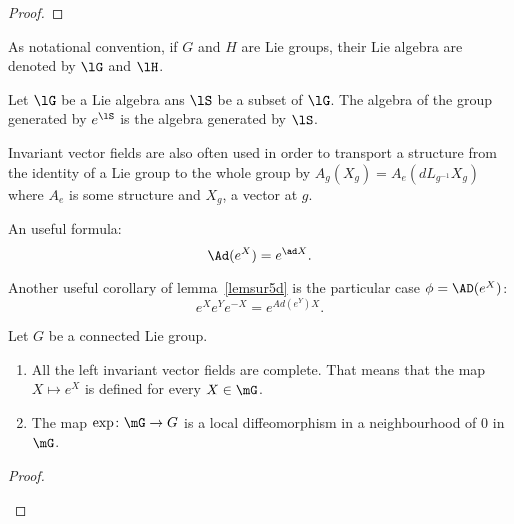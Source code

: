 \begin{theorem}
\begin{proof}
\end{proof}

As notational convention, if $G$ and $H$ are Lie groups, their Lie algebra are denoted by $\lG$ and $\lH$.

\begin{lemma}		\label{LemAlgEtGroupesGenere}
	Let $\lG$ be a Lie algebra ans $\lS$ be a subset of $\lG$. The algebra of the group generated by $ e^{\lS}$ is the algebra generated by $\lS$.
\end{lemma}

Invariant vector fields are also often used in order to transport a structure from the identity of a Lie group to the whole group by $A_g(X_g)=A_e(dL_{g^{-1}}X_g)$ where $A_e$ is some structure and $X_g$, a vector at $g$.


\begin{corollary}\label{Ad_e}
	An useful formula:
	\[
		\Ad(e^X)=e^{\ad X}.
	\]
\end{corollary}

\begin{corollary}
	Another useful corollary of lemma~\ref{lemsur5d} is the particular case $\phi=\AD(e^X)$:
	\[
		e^Xe^Ye^{-X}=e^{Ad(e^Y)X}.
	\]
	\label{cor:eXeYe-X}
\end{corollary}

\begin{proposition}
	Let $G$ be a connected Lie group.
	\begin{enumerate}

		\item
		      All the left invariant vector fields are complete. That means that the map $X\mapsto  e^{X}$ is defined for every $X\in \mG$.
		\item
		      The map $\exp\colon \mG\to G$ is a local diffeomorphism in a neighbourhood of $0$ in $\mG$.
	\end{enumerate}
\end{proposition}

\begin{proof}
	\begin{enumerate}


\end{enumerate}
\end{proof}
\end{theorem}
